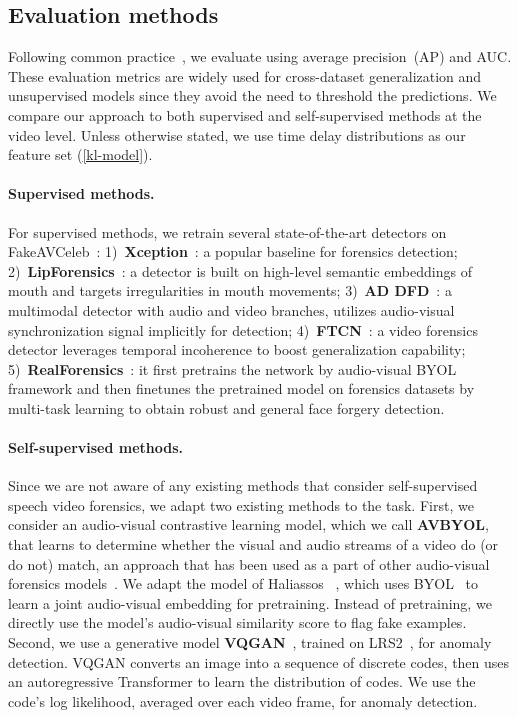 \documentclass[10pt,twocolumn,letterpaper]{article}
\newcommand{\mypar}[1]{\vspace{-3mm}\paragraph{#1}}
\begin{document}
\subsection{Evaluation methods}
Following common practice~\cite{wang2019cnn, rossler2019faceforensics++, li2020face, chai2020makes, qian2020thinking, haliassos2021lips, zheng2021exploring, haliassos2022leveraging, kwon2021kodf, NEURIPS_DATASETS_AND_BENCHMARKS2021_d9d4f495}, we evaluate using average precision~(AP) and AUC. These evaluation metrics are widely used for cross-dataset generalization and unsupervised models since they avoid the need to threshold the predictions. We compare our approach to both supervised and self-supervised methods at the video level. Unless otherwise stated, we use time delay distributions as our feature set (\cref{kl-model}). 

\mypar{Supervised methods.}
For supervised methods, we retrain several state-of-the-art detectors on FakeAVCeleb~\cite{NEURIPS_DATASETS_AND_BENCHMARKS2021_d9d4f495}: 1)~{\bf Xception}~\cite{rossler2019faceforensics++}: a popular baseline for forensics detection; 2)~{\bf LipForensics}~\cite{haliassos2021lips}: a detector is built on high-level semantic embeddings of mouth and targets irregularities in mouth movements; 3)~{\bf AD DFD}~\cite{zhou2021joint}: a multimodal detector with audio and video branches, utilizes audio-visual synchronization signal implicitly for detection; 4)~{\bf FTCN}~\cite{zheng2021exploring}: a video forensics detector leverages temporal incoherence to boost generalization capability; 5)~{\bf RealForensics}~\cite{haliassos2022leveraging}: it first pretrains the network by audio-visual BYOL~\cite{grill2020bootstrap} framework and then finetunes the pretrained model on forensics datasets by multi-task learning to obtain robust and general face forgery detection.

\mypar{Self-supervised methods.}
Since we are not aware of any existing methods that consider self-supervised speech video forensics, we adapt two existing methods to the task. First, we consider an audio-visual contrastive learning model, which we call  {\bf AVBYOL}, that learns to determine whether the visual and audio streams of a video do (or do not) match, an approach that has been used as a part of other audio-visual forensics models~\cite{haliassos2022leveraging,cozzolino2022audio}. We adapt the model of Haliassos \etal~\cite{haliassos2022leveraging}, which uses BYOL~\cite{grill2020bootstrap} to learn a joint audio-visual embedding for pretraining. Instead of pretraining, we directly use the model's audio-visual similarity score to flag fake examples.
Second, we use a generative model {\bf VQGAN}~\cite{esser2021taming}, trained on LRS2~\cite{Afouras18c}, for anomaly detection. VQGAN converts an image into a sequence of discrete codes, then uses an autoregressive Transformer to learn the distribution of codes. We use the code's log likelihood, averaged over each video frame, for anomaly detection.
\end{document}
